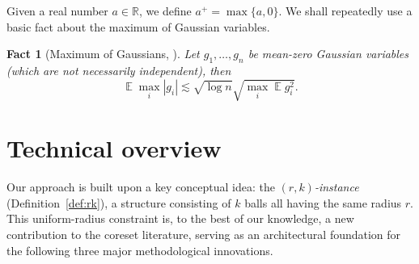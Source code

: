 \documentclass[11pt,letterpaper]{article}
\newtheorem{fact}[theorem]{Fact}
\theoremstyle{definition}
\DeclareMathOperator*{\E}{\ensuremath{\mathbb{E}}}
\begin{document}
Given a real number $a \in \mathbb{R}$, we define $a^+ = \max\{a, 0\}$.
%
We shall repeatedly use a basic fact about the maximum of Gaussian variables.

\begin{fact}[Maximum of Gaussians, {\cite[p79]{LT91}}] \label{fact_max_gauss}
	Let $g_1,\dots,g_n$ be mean-zero Gaussian variables (which are not necessarily independent), then
	$$
	\E \max_i |g_i|\lesssim \sqrt{\log n} \sqrt{\max_i \E g_i^2}.
	$$
\end{fact}


\section{Technical overview}
\label{sec:overview}

Our approach is built upon a key conceptual idea: the \emph{\((r,k)\)-instance} (Definition~\ref{def:rk}), a structure consisting of \(k\) balls all having the same radius \(r\).  
%
This uniform-radius constraint is, to the best of our knowledge, a new contribution to the coreset literature, serving as an architectural foundation for the following three major methodological innovations. 
%
\end{document}

